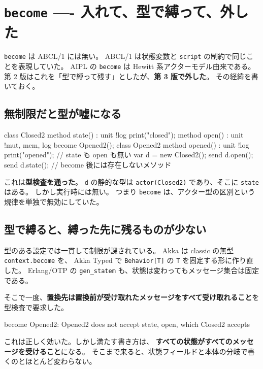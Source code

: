 \documentclass[11pt,a4paper]{ltjsarticle}
\theoremstyle{definition}
\theoremstyle{remark}
\begin{document}
\section{\texttt{become} ---- 入れて、型で縛って、外した}
\label{sec:become}

\texttt{become} は ABCL/1 には無い。
ABCL/1 は状態変数と \texttt{script} の制約で同じことを表現していた。
AIPL の \texttt{become} は Hewitt 系アクターモデル由来である。
第 2 版はこれを「型で縛って残す」としたが、\textbf{第 3 版で外した}。
その経緯を書いておく。

\subsection{無制限だと型が嘘になる}

\begin{aipl}
class Closed2 {
  method state() : unit !{log} { print("closed"); }
  method open()  : unit !{mut, mem, log} { become Opened2(); }
}
class Opened2 {
  method opened() : unit !{log} { print("opened"); }   // state も open も無い
}
var d = new Closed2();
send d.open();
send d.state();        // become 後には存在しないメソッド
\end{aipl}

これは\textbf{型検査を通った}。
\texttt{d} の静的な型は \texttt{actor(Closed2)} であり、そこに \texttt{state} はある。
しかし実行時には無い。
つまり \texttt{become} は、アクター型の区別という規律を単独で無効にしていた。

\subsection{型で縛ると、縛った先に残るものが少ない}

型のある設定では一貫して制限が課されている。
Akka は classic の無型 \texttt{context.become} を、
Akka Typed で \texttt{Behavior[T]} の \texttt{T} を固定する形に作り直した。
Erlang/OTP の \texttt{gen\_statem} も、状態は変わってもメッセージ集合は固定である。

そこで一度、\textbf{置換先は置換前が受け取れたメッセージをすべて受け取れること}を
型検査で要求した。

\begin{term}
 become Opened2: Opened2 does not accept state, open,
             which Closed2 accepts
\end{term}

これは正しく効いた。しかし満たす書き方は、
\textbf{すべての状態がすべてのメッセージを受けること}になる。
そこまで来ると、状態フィールドと本体の分岐で書くのとほとんど変わらない。
\end{document}

